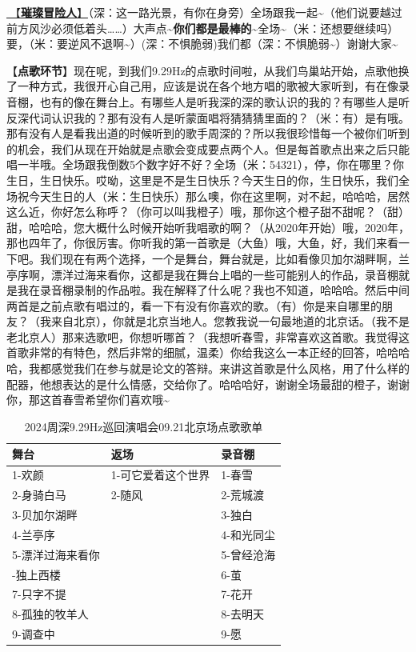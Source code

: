 \documentclass[]{ctexbook}
\begin{document}
\hyperref[adventurers]{🎵【\textbf{璀璨冒险人}】}（深：这一路光景，有你在身旁）全场跟我一起\textasciitilde（他们说要越过前方风沙必须低着头\ldots\ldots）大声点\textasciitilde{}\textbf{你们都是最棒的\textasciitilde{}}全场\textasciitilde（米：还想要继续吗）要，（米：要逆风不退啊\textasciitilde）(深：不惧脆弱)我们都（深：不惧脆弱\textasciitilde）谢谢大家\textasciitilde{}

【\textbf{点歌环节}】现在呢，到我们9.29Hz的点歌时间啦，从我们鸟巢站开始，点歌他换了一种方式，我很开心自己用，应该是说在各个地方唱的歌被大家听到，有在像录音棚，也有的像在舞台上。有哪些人是听我深的深的歌认识的我的？有哪些人是听反深代词认识我的？那有没有人是听蒙面唱将猜猜猜里面的？（米：有）是有哦。那有没有人是看我出道的时候听到的歌手周深的？所以我很珍惜每一个被你们听到的机会，我们从现在开始就是点歌会变成要点两个人。但是每首歌点出来之后只能唱一半哦。全场跟我倒数5个数字好不好？全场（米：54321），停，你在哪里？你生日，生日快乐。哎呦，这里是不是生日快乐？今天生日的你，生日快乐，我们全场祝今天生日的人（米：生日快乐）那么噢，你在这里啊，对不起，哈哈哈，居然这么近，你好怎么称呼？（你可以叫我橙子）哦，那你这个橙子甜不甜呢？（甜）甜，哈哈哈，您大概什么时候开始听我唱歌的啊？（从2020年开始）哦，2020年，那也四年了，你很厉害。你听我的第一首歌是（大鱼）哦，大鱼，好，我们来看一下吧。我们现在有两个选择，一个是舞台，舞台就是，比如看像贝加尔湖畔啊，兰亭序啊，漂洋过海来看你，这都是我在舞台上唱的一些可能别人的作品，录音棚就是我在录音棚录制的作品啦。我在解释了什么呢？我也不知道，哈哈哈。然后中间两首是之前点歌有唱过的，看一下有没有你喜欢的歌。（有）你是来自哪里的朋友？（我来自北京），你就是北京当地人。您教我说一句最地道的北京话。（我不是老北京人）那来选歌吧，你想听哪首？（我想听春雪，非常喜欢这首歌。我觉得这首歌非常的有特色，然后非常的细腻，温柔）你给我这么一本正经的回答，哈哈哈哈，我都感觉我们在参与就是论文的答辩。来讲这首歌是什么风格，用了什么样的配器，他想表达的是什么情感，交给你了。哈哈哈好，谢谢全场最甜的橙子，谢谢你，那这首春雪希望你们喜欢哦\textasciitilde{}

\begin{table}

\caption{\label{tab:unnamed-chunk-99}2024周深9.29Hz巡回演唱会09.21北京场点歌歌单}
\centering
\begin{tabular}[t]{lll}
\toprule
舞台 & 返场 & 录音棚\\
\midrule
1-欢颜 & 1-可它爱着这个世界 & 1-春雪\\
2-身骑白马 & 2-随风 & 2-荒城渡\\
3-贝加尔湖畔 &  & 3-独白\\
4-兰亭序 &  & 4-和光同尘\\
5-漂洋过海来看你 &  & 5-曾经沧海\\
\addlinespace
6-独上西楼 &  & 6-茧\\
7-只字不提 &  & 7-花开\\
8-孤独的牧羊人 &  & 8-去明天\\
9-调查中 &  & 9-愿\\
\bottomrule
\end{tabular}
\end{table}
\end{document}
